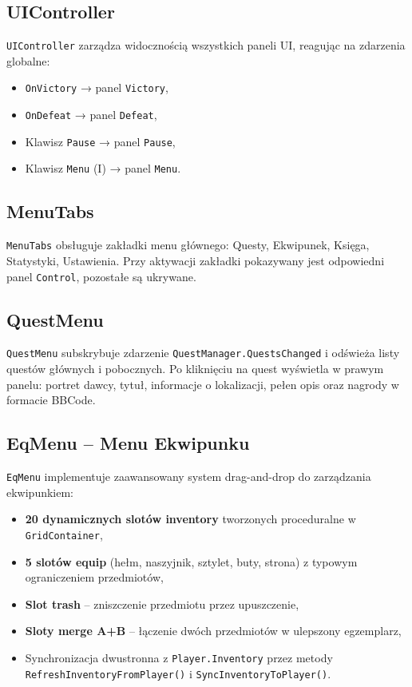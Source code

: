 \subsection{UIController}

\texttt{UIController} zarządza widocznością wszystkich paneli UI, reagując na zdarzenia globalne:
\begin{itemize}
    \item \texttt{OnVictory} → panel \texttt{Victory},
    \item \texttt{OnDefeat} → panel \texttt{Defeat},
    \item Klawisz \texttt{Pause} → panel \texttt{Pause},
    \item Klawisz \texttt{Menu} (I) → panel \texttt{Menu}.
\end{itemize}

\subsection{MenuTabs}

\texttt{MenuTabs} obsługuje zakładki menu głównego: Questy, Ekwipunek, Księga, Statystyki, Ustawienia. Przy aktywacji zakładki pokazywany jest odpowiedni panel \texttt{Control}, pozostałe są ukrywane.

\subsection{QuestMenu}

\texttt{QuestMenu} subskrybuje zdarzenie \texttt{QuestManager.QuestsChanged} i odświeża listy questów głównych i pobocznych. Po kliknięciu na quest wyświetla w prawym panelu: portret dawcy, tytuł, informacje o lokalizacji, pełen opis oraz nagrody w formacie BBCode.

\subsection{EqMenu – Menu Ekwipunku}

\texttt{EqMenu} implementuje zaawansowany system drag-and-drop do zarządzania ekwipunkiem:
\begin{itemize}
    \item \textbf{20 dynamicznych slotów inventory} tworzonych proceduralne w \texttt{GridContainer},
    \item \textbf{5 slotów equip} (hełm, naszyjnik, sztylet, buty, strona) z typowym ograniczeniem przedmiotów,
    \item \textbf{Slot trash} – zniszczenie przedmiotu przez upuszczenie,
    \item \textbf{Sloty merge A+B} – łączenie dwóch przedmiotów w ulepszony egzemplarz,
    \item Synchronizacja dwustronna z \texttt{Player.Inventory} przez metody \texttt{RefreshInventoryFromPlayer()} i \texttt{SyncInventoryToPlayer()}.
\end{itemize}

